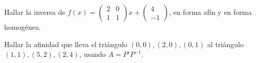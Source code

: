 \begin{ejercicio}
Hallar la inversa de \(f(x)=\begin{pmatrix}2&0\\1&1\end{pmatrix}x+\begin{pmatrix}4\\-1\end{pmatrix}\),
en forma afín y en forma homogénea.
\end{ejercicio}

\begin{ejercicio}
Hallar la afinidad que lleva el triángulo \((0,0),(2,0),(0,1)\) al triángulo
\((1,1),(5,2),(2,4)\), usando \(A=P'P^{-1}\).
\end{ejercicio}
